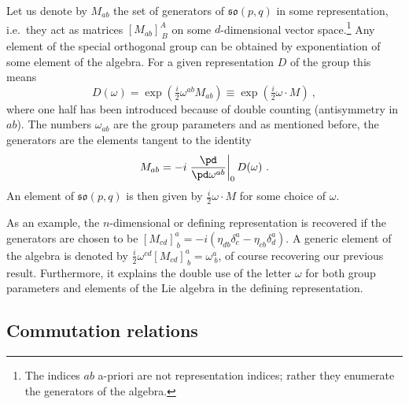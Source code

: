 \documentclass[10pt]{amsart}
\numberwithin{equation}{section}
\begin{document}
Let us denote by $M_{ab}$ the set of generators of 
$\mathfrak{so}(p,q)$ in some representation, i.e.~they act as 
matrices $[M_{ab}]^{A}_{~B}$ on some $d$-dimensional vector 
space.\footnote{The indices $ab$ a-priori are not representation 
	indices; rather they enumerate the generators of the algebra.} 
Any element of the special orthogonal group can be obtained by 
exponentiation of some element of the algebra. For a given 
representation $D$ of the group this means
%
\begin{equation}
	D(\omega) = \exp(\tfrac{i}{2} \omega^{ab} M_{ab}) \equiv 
	\exp(\tfrac{i}{2}\omega\cdot M)~,
\end{equation}
where one half has been introduced because of double counting 
(antisymmetry in $ab$). The numbers $\omega_{ab}$ are the group 
parameters and as mentioned before, the generators are the 
elements tangent to the identity
%
\begin{displaymath}
	M_{ab} = -i \left.\frac{\pd}{\pd \omega^{ab}}\right|_0 
	D(\omega)~.
\end{displaymath}
An element of $\mathfrak{so}(p,q)$ is then given by 
$\tfrac{i}{2}\omega\cdot M$ for some choice of $\omega$.

As an example, the $n$-dimensional or defining representation is 
recovered if the generators are chosen to be $[M_{cd}]^a_{~b} = 
-i(\eta_{db} \delta^a_c - \eta_{cb} \delta^a_d)$. A generic 
element of the algebra is denoted by $\tfrac{i}{2} 
\omega^{cd}[M_{cd}]^a_{~b} = \omega^a_{~b}$, of course recovering 
our previous result.  Furthermore, it explains the double use of 
the letter $\omega$ for both group parameters and elements of the 
Lie algebra in the defining representation. 

\subsection{Commutation relations}
\end{document}
